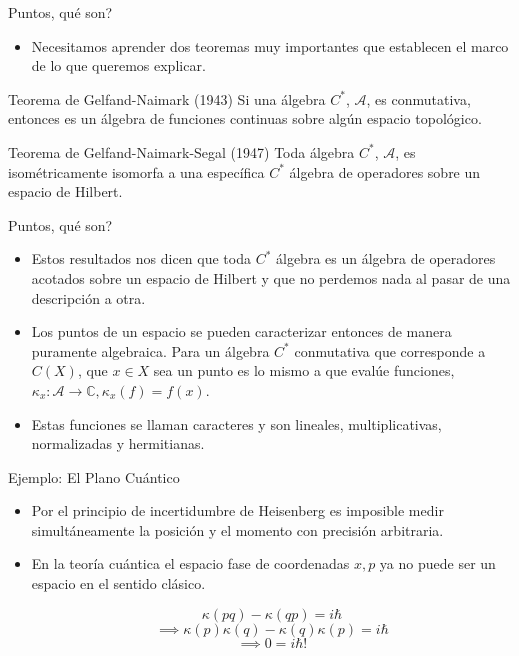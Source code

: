 \documentclass{beamer}
\begin{document}
\begin{frame}{Puntos, qué son?}

\begin{itemize}
\item Necesitamos aprender dos teoremas muy importantes que establecen el marco de lo que queremos explicar.
\vspace{5mm}
\end{itemize}
\begin{block}{Teorema de Gelfand-Naimark (1943)}
Si una álgebra $C^*$, $\mathcal{A}$, es conmutativa, entonces es un álgebra de funciones continuas sobre algún espacio topológico.
\end{block}
\begin{block}{Teorema de Gelfand-Naimark-Segal (1947)}
Toda álgebra $C^*$, $\mathcal{A}$, es isométricamente isomorfa a una específica $C^*$ álgebra de operadores sobre un espacio de Hilbert.
\end{block}
\end{frame}


\begin{frame}{Puntos, qué son?}

\begin{itemize}
\item Estos resultados nos dicen que toda $C^*$ álgebra es un álgebra de operadores acotados sobre un espacio de Hilbert y que no perdemos nada al pasar de una descripción a otra.
\vspace{5mm}
\item Los puntos de un espacio se pueden caracterizar entonces de manera puramente algebraica. Para un álgebra $C^*$ conmutativa que corresponde a $C(X)$, que $x \in X$ sea un punto es lo mismo a que evalúe funciones,  $\kappa_x : \mathcal{A} \to \mathbb{C}, \kappa_x (f) = f(x) $.
\vspace{5mm}
\item Estas funciones se llaman caracteres y son lineales, multiplicativas, normalizadas y hermitianas.
\end{itemize}
\end{frame}



\begin{frame}{Ejemplo: El Plano Cuántico}

\begin{itemize}
\item Por el principio de incertidumbre de Heisenberg es imposible medir simultáneamente la posición y el momento con precisión arbitraria.
\vspace{5mm}
\item En la teoría cuántica el espacio fase de coordenadas $x,p$ ya no puede ser un espacio en el sentido clásico.
\vspace{5mm}

\[
\kappa (pq) - \kappa (qp) = i \hbar 
\]
\[
\implies \kappa (p) \kappa(q) - \kappa (q)\kappa (p) = i \hbar 
\]
\[
\implies 0 = i \hbar !
\]

\end{itemize}
\end{frame}
\end{document}
